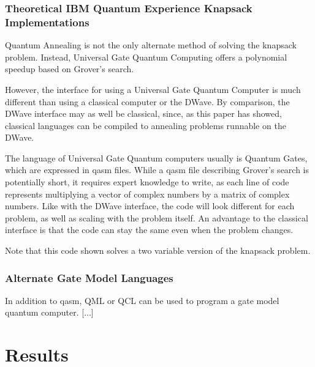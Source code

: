 \documentclass{article}
\begin{document}
\subsubsection{Theoretical IBM Quantum Experience Knapsack Implementations}

Quantum Annealing is not the only alternate method of solving the knapsack problem.
Instead, Universal Gate Quantum Computing offers a polynomial speedup based on Grover's search.

However, the interface for using a Universal Gate Quantum Computer is much different than using a classical computer or the DWave.
By comparison, the DWave interface may as well be classical, since, as this paper has showed, classical languages can be compiled to annealing problems runnable on the DWave.

The language of Universal Gate Quantum computers usually is Quantum Gates, which are expressed in qasm files.
While a qasm file describing Grover's search is potentially short, it requires expert knowledge to write, as each line of code represents multiplying a vector of complex numbers by a matrix of complex numbers.
Like with the DWave interface, the code will look different for each problem, as well as scaling with the problem itself.
An advantage to the classical interface is that the code can stay the same even when the problem changes.       

Note that this code shown solves a two variable version of the knapsack problem.

\lstset{language=C}


\subsubsection{Alternate Gate Model Languages}

In addition to qasm, QML or QCL can be used to program a gate model quantum computer.
[...]

\section{Results}
\end{document}
